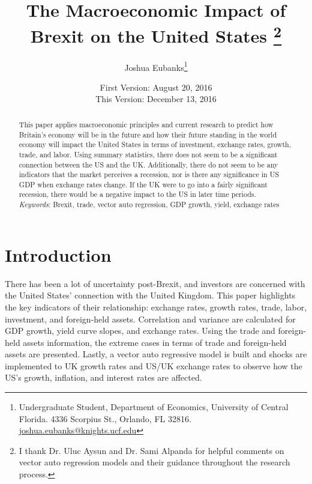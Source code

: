 \documentclass[12pt]{article}
\begin{document}
\title{The Macroeconomic Impact of Brexit on the United States%
\thanks{%
I thank Dr. Uluc Aysun and Dr. Sami Alpanda for helpful comments on vector auto regression models and their guidance throughout the research process.}}
\date{First Version: August 20, 2016\\
This Version: December 13, 2016}
\author{Joshua Eubanks\thanks{%
Undergraduate Student, Department of Economics, University of Central Florida. 4336 Scorpius St.,
Orlando, FL 32816. \href{mailto:joshua.eubanks@knights.ucf.edu}{joshua.eubanks@knights.ucf.edu}}}
\maketitle
\thispagestyle{empty}
\begin{abstract}

This paper applies macroeconomic principles and current research to predict how Britain's economy will be in the future and how their future standing in the world economy will impact the United States in terms of investment, exchange rates, growth, trade, and labor. Using summary statistics, there does not seem to be a significant connection between the US and the UK. Additionally, there do not seem to be any indicators that the market perceives a recession, nor is there any significance in US GDP when exchange rates change. If the UK were to go into a fairly significant recession, there would be a negative impact to the US in later time periods.\\ 

\noindent \textit{Keywords}: Brexit, trade, vector auto regression, GDP growth, yield, exchange rates 

\setcounter{page}{0}\thispagestyle{empty}
\end{abstract}
\newpage
\section{Introduction}
There has been a lot of uncertainty post-Brexit, and investors are concerned with the United States' connection with the United Kingdom. This paper highlights the key indicators of their relationship:  exchange rates, growth rates, trade, labor, investment, and foreign-held assets. Correlation and variance are calculated for GDP growth, yield curve slopes, and exchange rates. Using the trade and foreign-held assets information, the extreme cases in terms of trade and foreign-held assets are presented. Lastly, a vector auto regressive model is built and shocks are implemented to UK growth rates and US/UK exchange rates to observe how the US's growth, inflation, and interest rates are affected.\\
\end{document}
